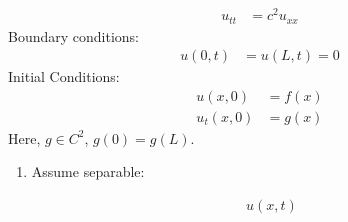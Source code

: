 \begin{align}
  u_{tt} & = c^2 u_{xx}
\end{align}
Boundary conditions:
\begin{align}
  u(0, t) & = u(L, t) = 0
\end{align}
Initial Conditions:
\begin{align}
  u(x, 0) & = f(x)\\
  u_t(x, 0) & = g(x)
\end{align}
Here, $g \in C^2$, $g(0) = g(L)$.
\begin{enumerate}
  \item Assume separable:

  \begin{align}
    u(x, t)
  \end{align}


\end{enumerate}
